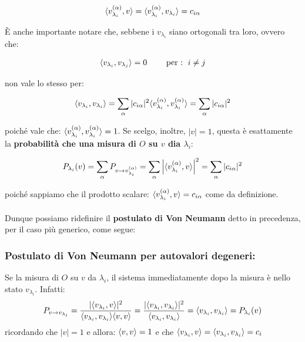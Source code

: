 \begin{align*}
	\langle v_{\lambda_i}^{\qty(\alpha)}, v \rangle= \langle v_{\lambda_i}^{\qty(\alpha)}, v_{\lambda_i} \rangle = c_{i \alpha} 
\end{align*} 

	È anche importante notare che, sebbene i $v_{\lambda_i}$ siano ortogonali tra loro, ovvero che:
	
\begin{align*}
	\langle v_{\lambda_i}, v_{\lambda_j} \rangle = 0 \qquad \text{  per :  } \, i \neq j
\end{align*}
	
	non vale lo stesso per:
	
\begin{align*}
	\langle v_{\lambda_i}, v_{\lambda_i} \rangle = \sum_{\alpha} |c_{i\alpha}|^2 \langle v_{\lambda_i}^{\qty(\alpha)}, v_{\lambda_i}^{\qty(\alpha)} \rangle = \sum_{\alpha} |c_{i\alpha}|^2
\end{align*}

	poiché vale che: $\langle v_{\lambda_i}^{\qty(\alpha)}, v_{\lambda_i}^{\qty(\alpha)} \rangle = 1$. Se scelgo, inoltre, $|v| = 1$, questa è esattamente la \textbf{probabilità che una misura di $O$ su $v$ dia $\lambda_i$}:
	
\begin{align*}
	P_{\lambda_i}\qty(v) = \sum_{\alpha} P_{v\to v_{\lambda_i}^{\qty(\alpha)}} = \sum_{\alpha} \abs{ \langle   v_{\lambda_i}^{\qty(\alpha)} , v  \rangle}^2 = \sum_{\alpha} |c_{i\alpha}|^2
\end{align*}

	poiché sappiamo che il prodotto scalare: $ \langle   v_{\lambda_i}^{\qty(\alpha)} , v  \rangle = c_{i\alpha}$ come da definizione.
	\\
	\\
	Dunque possiamo ridefinire il \textbf{postulato di Von Neumann} detto in precedenza, per il caso più generico, come segue: 

\begin{myprop}
\subsubsection{Postulato di Von Neumann per autovalori degeneri:}

	Se la misura di $O$ su $v$ da $\lambda_i$, il sistema immediatamente dopo la misura è nello stato $v_{\lambda_i}$. Infatti:
\begin{align*}
	P_{v\to v_{\lambda_i}} = \frac{|\langle v_{\lambda_i}, v \rangle|^2}{\langle v_{\lambda_i},v_{\lambda_i}  \rangle \langle v, v \rangle } = \frac{ |\langle v_{\lambda_i}, v_{\lambda_i} \rangle|^2  }{\langle v_{\lambda_i},v_{\lambda_i}  \rangle} = \langle v_{\lambda_i}, v_{\lambda_i} \rangle = P_{\lambda_i}\qty(v) 
\end{align*} 
	ricordando che $|v| = 1$ e allora: $\langle v, v \rangle = 1$ e che $\langle v_{\lambda_i}, v \rangle = \langle v_{\lambda_i}, v_{\lambda_i} \rangle = c_{i}$
\end{myprop}

